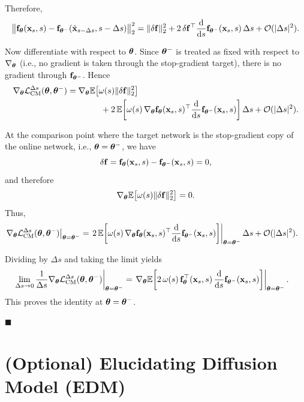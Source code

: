 Therefore,
\begin{align*}
\big\|{\mathbf{f}}_{{\bm{\theta}}}({\mathbf{x}}_s, s)- {\mathbf{f}}_{{\bm{\theta}}^-}(\tilde{{\mathbf{x}}}_{s-\Delta s}, s-\Delta s)\big\|_2^2
=
\|\delta {\mathbf{f}}\|_2^2
+
2\,\delta {\mathbf{f}}^\top \frac{\mathop{}\!\mathrm{d}}{\mathop{}\!\mathrm{d} s}{\mathbf{f}}_{{\bm{\theta}}^-}({\mathbf{x}}_s,s)\,\Delta s
+
\mathcal{O}(|\Delta s|^2).
\end{align*}

Now differentiate with respect to ${\bm{\theta}}$. Since ${\bm{\theta}}^-$ is treated as fixed with respect to $\nabla_{{\bm{\theta}}}$ (i.e., no gradient is taken through the stop-gradient target), there is no gradient through ${\mathbf{f}}_{{\bm{\theta}}^-}$. Hence
\begin{align*}
\nabla_{{\bm{\theta}}}\mathcal{L}_{\mathrm{CM}}^{\Delta s}({\bm{\theta}},{\bm{\theta}}^-)
&=
\nabla_{{\bm{\theta}}}\mathbb{E}\!\left[\omega(s)\|\delta {\mathbf{f}}\|_2^2\right]\\
&\qquad\qquad
+
2\,\mathbb{E}\!\left[
\omega(s)\,
\nabla_{{\bm{\theta}}}{\mathbf{f}}_{{\bm{\theta}}}({\mathbf{x}}_s,s)^\top
\frac{\mathop{}\!\mathrm{d}}{\mathop{}\!\mathrm{d} s}{\mathbf{f}}_{{\bm{\theta}}^-}({\mathbf{x}}_s,s)
\right]\Delta s
+
\mathcal{O}(|\Delta s|^2).
\end{align*}

At the comparison point where the target network is the stop-gradient copy of the online network, i.e., ${\bm{\theta}}={\bm{\theta}}^-$, we have
\[
\delta {\mathbf{f}}
=
{\mathbf{f}}_{{\bm{\theta}}}({\mathbf{x}}_s,s)-{\mathbf{f}}_{{\bm{\theta}}^-}({\mathbf{x}}_s,s)
=
0,
\]
and therefore
\[
\nabla_{{\bm{\theta}}}\mathbb{E}\!\left[\omega(s)\|\delta {\mathbf{f}}\|_2^2\right]=0.
\]
Thus,
\begin{align*}
\left.
\nabla_{{\bm{\theta}}}\mathcal{L}_{\mathrm{CM}}^{\Delta s}({\bm{\theta}},{\bm{\theta}}^-)
\right|_{{\bm{\theta}}={\bm{\theta}}^-}
&=
\left.
2\,\mathbb{E}\!\left[
\omega(s)\,
\nabla_{{\bm{\theta}}}{\mathbf{f}}_{{\bm{\theta}}}({\mathbf{x}}_s,s)^\top
\frac{\mathop{}\!\mathrm{d}}{\mathop{}\!\mathrm{d} s}{\mathbf{f}}_{{\bm{\theta}}^-}({\mathbf{x}}_s,s)
\right]
\right|_{{\bm{\theta}}={\bm{\theta}}^-}\Delta s
+
\mathcal{O}(|\Delta s|^2).
\end{align*}

Dividing by $\Delta s$ and taking the limit yields
\begin{align*}
\left.
\lim_{\Delta s\to 0}\frac{1}{\Delta s}\nabla_{{\bm{\theta}}}\mathcal{L}_{\mathrm{CM}}^{\Delta s}({\bm{\theta}},{\bm{\theta}}^-)
\right|_{{\bm{\theta}}={\bm{\theta}}^-}
&=
\left.
\nabla_{{\bm{\theta}}}\mathbb{E}\!\left[
2\,\omega(s)\,
{\mathbf{f}}_{{\bm{\theta}}}^\top({\mathbf{x}}_s,s)\,
\frac{\mathop{}\!\mathrm{d}}{\mathop{}\!\mathrm{d} s}{\mathbf{f}}_{{\bm{\theta}}^-}({\mathbf{x}}_s,s)
\right]
\right|_{{\bm{\theta}}={\bm{\theta}}^-}.
\end{align*}
This proves the identity at ${\bm{\theta}}={\bm{\theta}}^-$.

\hfill$\blacksquare$


\newpage
\section{(Optional) Elucidating Diffusion Model (EDM)}\label{sec:edm}

